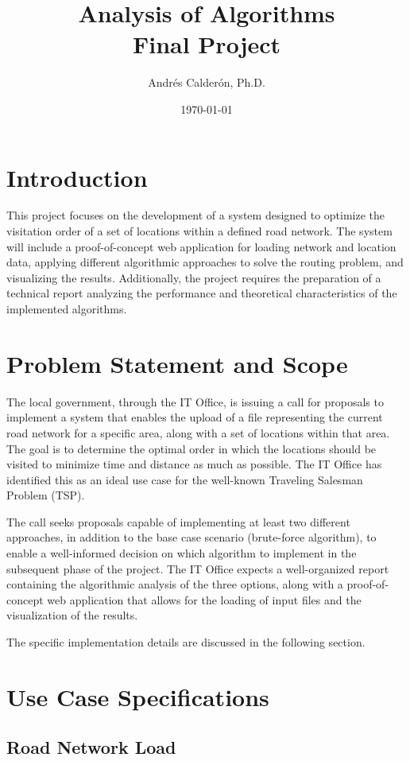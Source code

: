 \documentclass[11pt]{article}
\title{Analysis of Algorithms \\ Final Project}
\author{Andrés Calderón, Ph.D.}
\date{\today}
\begin{document}
\maketitle

\section{Introduction}

This project focuses on the development of a system designed to optimize the visitation order of a set of locations within a defined road network. The system will include a proof-of-concept web application for loading network and location data, applying different algorithmic approaches to solve the routing problem, and visualizing the results. Additionally, the project requires the preparation of a technical report analyzing the performance and theoretical characteristics of the implemented algorithms.

\section{Problem Statement and Scope}
The local government, through the IT Office, is issuing a call for proposals to implement a system that enables the upload of a file representing the current road network for a specific area, along with a set of locations within that area. The goal is to determine the optimal order in which the locations should be visited to minimize time and distance as much as possible. The IT Office has identified this as an ideal use case for the well-known Traveling Salesman Problem (TSP).

The call seeks proposals capable of implementing at least two different approaches, in addition to the base case scenario (brute-force algorithm), to enable a well-informed decision on which algorithm to implement in the subsequent phase of the project.  The IT Office expects a well-organized report containing the algorithmic analysis of the three options, along with a proof-of-concept web application that allows for the loading of input files and the visualization of the results.

The specific implementation details are discussed in the following section.

\section{Use Case Specifications}

\subsection{Road Network Load}
\end{document}
